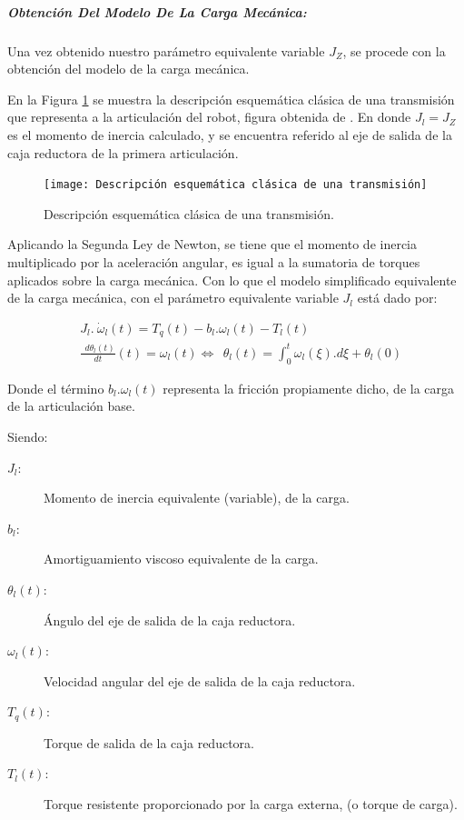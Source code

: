 \documentclass{article}
\begin{document}
\begin{sloppypar}
\hfill
\subparagraph{\textbf{Obtención Del Modelo De La Carga Mecánica:}}
\label{sec:Obtención Del Modelo De La Carga Mecánica}

\hfill

\hfill

Una vez obtenido nuestro parámetro equivalente variable $J_Z$, se procede con la obtención del modelo de la carga mecánica.

En la Figura \ref{fig:Descripción esquemática clásica de una transmisión} se muestra la descripción esquemática clásica de una transmisión que representa a la articulación del robot, figura obtenida de \cite{arenas2023virtual}. En donde $J_l=J_Z$ es el momento de inercia calculado, y se encuentra referido al eje de salida de la caja reductora de la primera articulación.

\begin{figure}[H]
    \centering
    \texttt{[image: Descripción esquemática clásica de una transmisión]}
    \caption{Descripción esquemática clásica de una transmisión.}
    \label{fig:Descripción esquemática clásica de una transmisión}
\end{figure}

Aplicando la Segunda Ley de Newton, se tiene que el momento de inercia multiplicado por la aceleración angular, es igual a la sumatoria de torques aplicados sobre la carga mecánica. Con lo que el modelo simplificado equivalente de la carga mecánica, con el parámetro equivalente variable $J_l$ está dado por:

\begin{subequations} \label{eq:J_l y theta_l}
    \begin{align}
        & \label{eq:J_l}         J_l.\ {\dot{\omega}}_l\left(t\right)=T_q\left(t\right)-b_l.\omega_l(t)-T_l(t)
        \\
        & \label{eq:theta_l(t)}     \frac{{\ \ d\theta}_l\left(t\right)}{dt}\left(t\right)=\omega_l\left(t\right)\Leftrightarrow{\ \ \theta}_l\left(t\right)=\int_{0}^{t}{\omega_l\left(\xi\right).d\xi}+\theta_l\left(0\right)
    \end{align}
\end{subequations}

Donde el término $b_l.\omega_l(t)$ representa la fricción propiamente dicho, de la carga de la articulación base.

Siendo:
\begin{description}
    \item[$J_l:$] Momento de inercia equivalente (variable), de la carga.
    \item[$b_l:$] Amortiguamiento viscoso equivalente de la carga.
    \item[$\theta_l(t):$] Ángulo del eje de salida de la caja reductora.
    \item[$\omega_l(t):$] Velocidad angular del eje de salida de la caja reductora.
    \item[$T_q(t):$] Torque de salida de la caja reductora.
    \item[$T_l(t):$] Torque resistente proporcionado por la carga externa, (o torque de carga).
\end{description}




\end{sloppypar}
\end{document}
